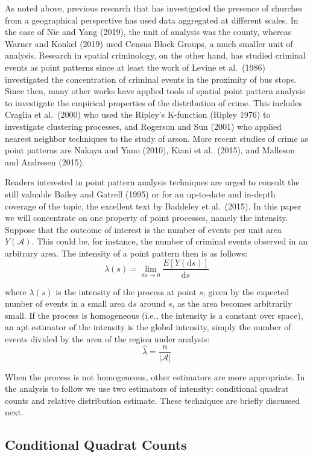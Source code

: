 \documentclass[smallextended]{svjour3}       %
\begin{document}
As noted above, previous research that has investigated the presence of
churches from a geographical perspective has used data aggregated at
different scales. In the case of Nie and Yang (2019), the unit of
analysis was the county, whereas Warner and Konkel (2019) used Census
Block Groups, a much smaller unit of analysis. Research in spatial
criminology, on the other hand, has studied criminal events as point
patterns since at least the work of Levine et al.~(1986) investigated
the concentration of criminal events in the proximity of bus stops.
Since then, many other works have applied tools of spatial point pattern
analysis to investigate the empirical properties of the distribution of
crime. This includes Craglia et al.~(2000) who used the Ripley's
K-function (Ripley 1976) to investigate clustering processes, and
Rogerson and Sun (2001) who applied nearest neighbor techniques to the
study of arson. More recent studies of crime as point patterns are
Nakaya and Yano (2010), Kiani et al.~(2015), and Malleson and Andresen
(2015).

Readers interested in point pattern analysis techniques are urged to
consult the still valuable Bailey and Gatrell (1995) or for an
up-to-date and in-depth coverage of the topic, the excellent text by
Baddeley et al.~(2015). In this paper we will concentrate on one
property of point processes, namely the intensity. Suppose that the
outcome of interest is the number of events per unit area
\(Y(\mathcal{A})\). This could be, for instance, the number of criminal
events observed in an arbitrary area. The intensity of a point pattern
then is as follows: \[
\lambda(s)=\lim_{\text{d}s \to 0}\frac{E[Y(\text{d}s)]}{\text{d}s}
\]

\noindent where \(\lambda(s)\) is the intensity of the process at point
\(s\), given by the expected number of events in a small area
\(\text{d}s\) around \(s\), as the area becomes arbitrarily small. If
the process is homogeneous (i.e., the intensity is a constant over
space), an apt estimator of the intensity is the global intensity,
simply the number of events divided by the area of the region under
analysis: \[
\hat{\lambda} = \frac{n}{|\mathcal{A}|}
\]

When the process is not homogeneous, other estimators are more
appropriate. In the analysis to follow we use two estimators of
intensity: conditional quadrat counts and relative distribution
estimate. These techniques are briefly discussed next.

\hypertarget{conditional-quadrat-counts}{%
\subsection{Conditional Quadrat
Counts}\label{conditional-quadrat-counts}}
\end{document}
